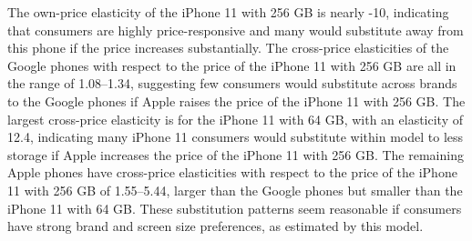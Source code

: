 \documentclass[11pt,letterpaper]{article}
\begin{document}
\begin{enumerate}[label=\alph*., leftmargin=*]
	The own-price elasticity of the iPhone 11 with 256 GB is nearly -10, indicating that consumers are highly price-responsive and many would substitute away from this phone if the price increases substantially. The cross-price elasticities of the Google phones with respect to the price of the iPhone 11 with 256 GB are all in the range of 1.08--1.34, suggesting few consumers would substitute across brands to the Google phones if Apple raises the price of the iPhone 11 with 256 GB. The largest cross-price elasticity is for the iPhone 11 with 64 GB, with an elasticity of 12.4, indicating many iPhone 11 consumers would substitute within model to less storage if Apple increases the price of the iPhone 11 with 256 GB. The remaining Apple phones have cross-price elasticities with respect to the price of the iPhone 11 with 256 GB of 1.55--5.44, larger than the Google phones but smaller than the iPhone 11 with 64 GB. These substitution patterns seem reasonable if consumers have strong brand and screen size preferences, as estimated by this model.
\end{enumerate}
\end{document}
